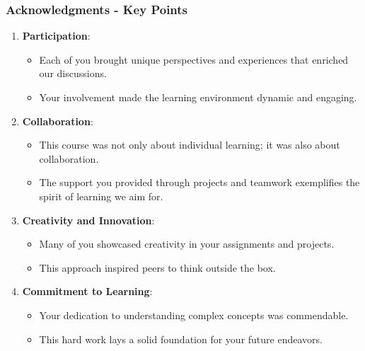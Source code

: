 \documentclass[aspectratio=169]{beamer}
\begin{document}
\begin{frame}[fragile]
    \frametitle{Acknowledgments - Key Points}
    \begin{enumerate}
        \item \textbf{Participation}:
        \begin{itemize}
            \item Each of you brought unique perspectives and experiences that enriched our discussions.
            \item Your involvement made the learning environment dynamic and engaging.
        \end{itemize}
        
        \item \textbf{Collaboration}:
        \begin{itemize}
            \item This course was not only about individual learning; it was also about collaboration.
            \item The support you provided through projects and teamwork exemplifies the spirit of learning we aim for.
        \end{itemize}
        
        \item \textbf{Creativity and Innovation}:
        \begin{itemize}
            \item Many of you showcased creativity in your assignments and projects.
            \item This approach inspired peers to think outside the box.
        \end{itemize}
        
        \item \textbf{Commitment to Learning}:
        \begin{itemize}
            \item Your dedication to understanding complex concepts was commendable.
            \item This hard work lays a solid foundation for your future endeavors.
        \end{itemize}
    \end{enumerate}
\end{frame}
\end{document}
